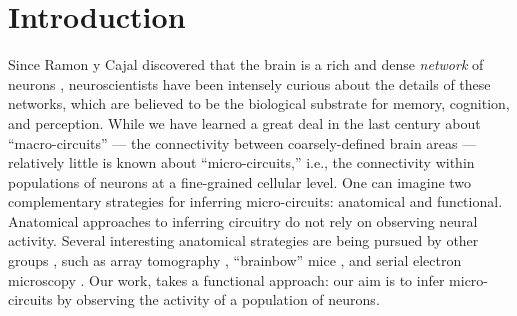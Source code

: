\documentclass[aoas,preprint]{imsart}
\begin{document}
\section{Introduction}
\label{intro}
Since Ramon y Cajal discovered that the brain is a rich and dense \emph{network} of neurons \cite{RamonyCajal04,RamonyCajal23}, neuroscientists have been intensely curious about the details of these networks, which are believed to be the biological substrate for memory, cognition, and perception. While we have learned a great deal in the last century about ``macro-circuits'' --- the connectivity between coarsely-defined brain areas --- relatively little is known about ``micro-circuits,'' i.e., the connectivity within populations of neurons at a fine-grained cellular level. One can imagine two complementary strategies for inferring micro-circuits: anatomical and functional. Anatomical approaches to inferring circuitry do not rely on observing neural activity.  Several interesting anatomical strategies are being pursued by other groups , such as array tomography \cite{MichevaSmith07}, ``brainbow'' mice \cite{Brainbow07}, and serial electron microscopy \cite{Briggman2006}. Our work,  takes a functional approach: our aim is to infer micro-circuits by observing the activity of a population of neurons.
\end{document}

